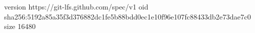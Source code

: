 version https://git-lfs.github.com/spec/v1
oid sha256:5192a85a35f3d376882dc1fe5b88bdd0ec1e10f96e107fc88433db2e73dae7c0
size 16480
